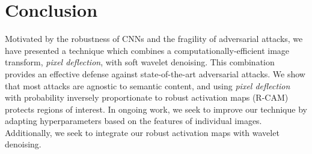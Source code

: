 \section{Conclusion}
Motivated by the robustness of CNNs and the fragility of adversarial attacks, we have presented a technique which combines a computationally-efficient image transform, \emph{pixel deflection}, with soft wavelet denoising. 
This combination provides an effective defense against state-of-the-art adversarial attacks. 
We show that most attacks are agnostic to semantic content, and using \emph{pixel deflection} with probability inversely proportionate to robust activation maps (R-CAM) protects regions of interest.
In ongoing work, we seek to improve our technique by adapting hyperparameters based on the features of individual images. Additionally, we seek to integrate our robust activation maps with wavelet denoising.
